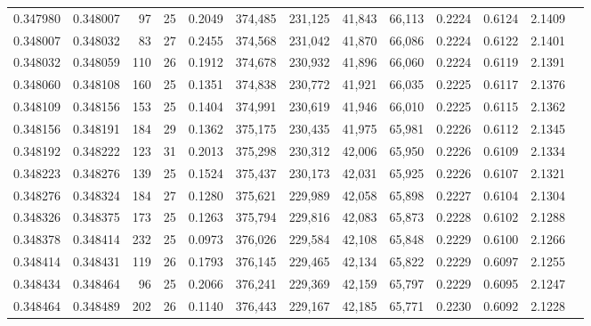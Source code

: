 \begin{tabular}{rrrrrrrrrrrrr}
0.347980 & 0.348007 &    97 &  25 &                                     0.2049 & 374,485 & 231,125 &  41,843 &  66,113 & 0.2224 & 0.6124 & 2.1409 \\
0.348007 & 0.348032 &    83 &  27 &                                     0.2455 & 374,568 & 231,042 &  41,870 &  66,086 & 0.2224 & 0.6122 & 2.1401 \\
0.348032 & 0.348059 &   110 &  26 &                                     0.1912 & 374,678 & 230,932 &  41,896 &  66,060 & 0.2224 & 0.6119 & 2.1391 \\
0.348060 & 0.348108 &   160 &  25 &                                     0.1351 & 374,838 & 230,772 &  41,921 &  66,035 & 0.2225 & 0.6117 & 2.1376 \\
0.348109 & 0.348156 &   153 &  25 &                                     0.1404 & 374,991 & 230,619 &  41,946 &  66,010 & 0.2225 & 0.6115 & 2.1362 \\
0.348156 & 0.348191 &   184 &  29 &                                     0.1362 & 375,175 & 230,435 &  41,975 &  65,981 & 0.2226 & 0.6112 & 2.1345 \\
0.348192 & 0.348222 &   123 &  31 &                                     0.2013 & 375,298 & 230,312 &  42,006 &  65,950 & 0.2226 & 0.6109 & 2.1334 \\
0.348223 & 0.348276 &   139 &  25 &                                     0.1524 & 375,437 & 230,173 &  42,031 &  65,925 & 0.2226 & 0.6107 & 2.1321 \\
0.348276 & 0.348324 &   184 &  27 &                                     0.1280 & 375,621 & 229,989 &  42,058 &  65,898 & 0.2227 & 0.6104 & 2.1304 \\
0.348326 & 0.348375 &   173 &  25 &                                     0.1263 & 375,794 & 229,816 &  42,083 &  65,873 & 0.2228 & 0.6102 & 2.1288 \\
0.348378 & 0.348414 &   232 &  25 &                                     0.0973 & 376,026 & 229,584 &  42,108 &  65,848 & 0.2229 & 0.6100 & 2.1266 \\
0.348414 & 0.348431 &   119 &  26 &                                     0.1793 & 376,145 & 229,465 &  42,134 &  65,822 & 0.2229 & 0.6097 & 2.1255 \\
0.348434 & 0.348464 &    96 &  25 &                                     0.2066 & 376,241 & 229,369 &  42,159 &  65,797 & 0.2229 & 0.6095 & 2.1247 \\
0.348464 & 0.348489 &   202 &  26 &                                     0.1140 & 376,443 & 229,167 &  42,185 &  65,771 & 0.2230 & 0.6092 & 2.1228 \\

\end{tabular}
